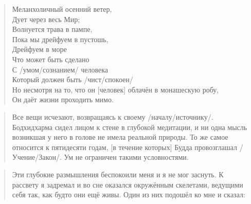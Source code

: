 \begin{ver}
\begin{quote}
  \begin{verses}
    Меланхоличный осенний ветер,\\
    Дует через весь Мир;\\
    Волнуется трава в пампе,\\
    Пока мы дрейфуем в пустошь,\\
    Дрейфуем в море\\
    
    Что может быть сделано\\
    С /умом/сознанием/ человека\\
    Который должен быть /чист/спокоен/\\
    Но несмотря на то, что он [человек] облачён в монашескую робу,\\
    Он даёт жизни проходить мимо.
  \end{verses}
\end{quote}
\end{ver}

\begin{ver}
\begin{quote}
  Все вещи исчезают, возвращаясь к своему
  /началу/источнику/. Бодхидхарма сидел лицом к стене в глубокой
  медитации, и ни одна мысль возникшая у него в голове не имела
  реальной природы. То же самое относится к пятидесяти годам, [в
    течение которых] Будда провозглашал /Учение/Закон/. Ум не
  ограничен такими условностями.  
\end{quote}
\end{ver}

\begin{ver}
\begin{quote}
  Эти глубокие размышления беспокоили меня и я не мог заснуть. К
  рассвету я задремал и во сне оказался окружённым скелетами, ведущими
  себя так, как будто они ещё живы. Один из них подошёл ко мне и сказал:
\end{quote}
\end{ver}

